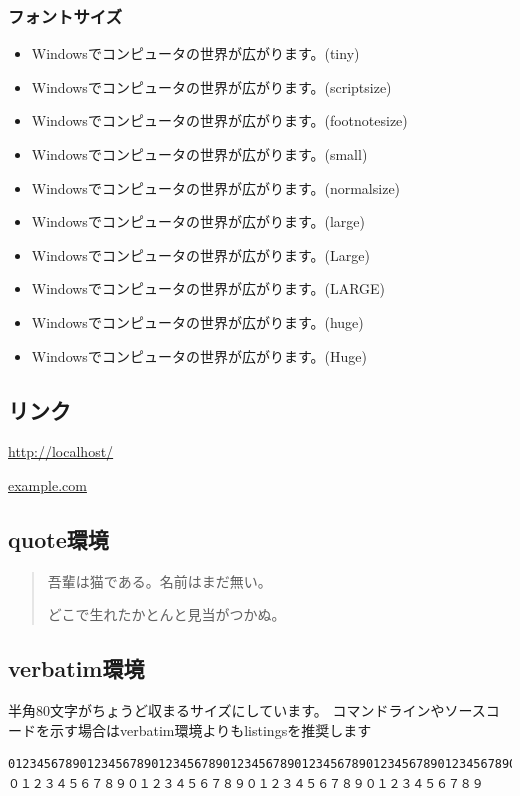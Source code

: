 \subsubsection{フォントサイズ}
\def\sampletext{Windowsでコンピュータの世界が広がります。}
\begin{itemize}
  \normalsize\item\tiny{\sampletext(tiny)}
  \normalsize\item\scriptsize{\sampletext(scriptsize)}
  \normalsize\item\footnotesize{\sampletext(footnotesize)}
  \normalsize\item\small{\sampletext(small)}
  \normalsize\item\normalsize{\sampletext(normalsize)}
  \normalsize\item\large{\sampletext(large)}
  \normalsize\item\Large{\sampletext(Large)}
  \normalsize\item\LARGE{\sampletext(LARGE)}
  \normalsize\item\huge{\sampletext(huge)}
  \normalsize\item\Huge{\sampletext(Huge)}
\end{itemize}
\normalsize

\subsection{リンク}
\url{http://localhost/}

\href{http://www.example.com/}{example.com}

\subsection{quote環境}

\begin{quote}
吾輩は猫である。名前はまだ無い。

どこで生れたかとんと見当がつかぬ。
\end{quote}

\subsection{verbatim環境}

半角80文字がちょうど収まるサイズにしています。
コマンドラインやソースコードを示す場合はverbatim環境よりもlistingsを推奨します

\begin{verbatim}
01234567890123456789012345678901234567890123456789012345678901234567890123456789
０１２３４５６７８９０１２３４５６７８９０１２３４５６７８９０１２３４５６７８９
\end{verbatim}

